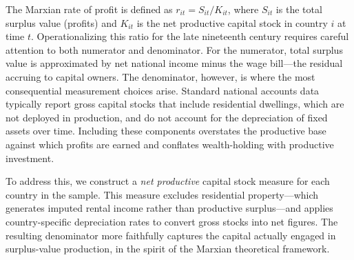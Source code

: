 \documentclass[10pt]{article}
\begin{document}
The Marxian rate of profit is defined as $r_{it} = S_{it} / K_{it}$, where $S_{it}$ is the total surplus value (profits) and $K_{it}$ is the net productive capital stock in country $i$ at time $t$. Operationalizing this ratio for the late nineteenth century requires careful attention to both numerator and denominator. For the numerator, total surplus value is approximated by net national income minus the wage bill---the residual accruing to capital owners. The denominator, however, is where the most consequential measurement choices arise. Standard national accounts data typically report gross capital stocks that include residential dwellings, which are not deployed in production, and do not account for the depreciation of fixed assets over time. Including these components overstates the productive base against which profits are earned and conflates wealth-holding with productive investment.

\par To address this, we construct a \emph{net productive} capital stock measure for each country in the sample. This measure excludes residential property---which generates imputed rental income rather than productive surplus---and applies country-specific depreciation rates to convert gross stocks into net figures. The resulting denominator more faithfully captures the capital actually engaged in surplus-value production, in the spirit of the Marxian theoretical framework.
\end{document}
